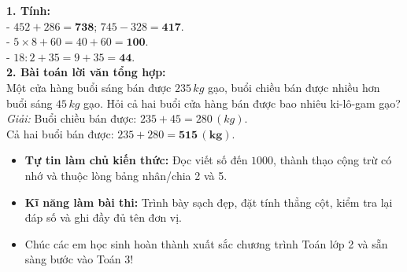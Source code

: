 \documentclass[10pt,a4paper]{article}
\begin{document}
\vspace{-1.5mm}
\noindent
\begin{minipage}[t]{0.49\textwidth}\vspace{0pt}
\begin{tcolorbox}[
  enhanced,
  colback=green!4!white,
  colframe=green!60!black,
  arc=2mm, boxrule=0.8pt,
  left=2mm, right=2mm, top=1.8mm, bottom=1.8mm,
  title={\footnotesize\bfseries\color{white}\faCheckCircle\ 4. Bài tập tổng hợp cuối năm mẫu}
]
{\footnotesize
\textbf{1. Tính:}\\
- $452 + 286 = \mathbf{738}$; \quad $745 - 328 = \mathbf{417}$.\\
- $5 \times 8 + 60 = 40 + 60 = \mathbf{100}$.\\
- $18 : 2 + 35 = 9 + 35 = \mathbf{44}$.\\
\textbf{2. Bài toán lời văn tổng hợp:}\\
Một cửa hàng buổi sáng bán được $235\,kg$ gạo, buổi chiều bán được nhiều hơn buổi sáng $45\,kg$ gạo. Hỏi cả hai buổi cửa hàng bán được bao nhiêu ki-lô-gam gạo?\\
\textit{Giải:} Buổi chiều bán được: $235 + 45 = 280\,(kg)$.\\
Cả hai buổi bán được: $235 + 280 = \mathbf{515\,(kg)}$.
}
\end{tcolorbox}
\end{minipage}
\hfill
\begin{minipage}[t]{0.49\textwidth}\vspace{0pt}
\begin{tcolorbox}[
  enhanced,
  colback=rose!4!white,
  colframe=rose!70!black,
  arc=2mm, boxrule=0.8pt,
  left=2mm, right=2mm, top=1.8mm, bottom=1.8mm,
  title={\footnotesize\bfseries\color{white}\faGraduationCap\ 5. Hành trang vững bước vào Lớp 3}
]
{\footnotesize
\begin{itemize}\setlength{\itemsep}{1.5pt}\setlength{\leftskip}{-2.5mm}
  \item \textbf{Tự tin làm chủ kiến thức:} Đọc viết số đến $1000$, thành thạo cộng trừ có nhớ và thuộc lòng bảng nhân/chia 2 và 5.
  \item \textbf{Kĩ năng làm bài thi:} Trình bày sạch đẹp, đặt tính thẳng cột, kiểm tra lại đáp số và ghi đầy đủ tên đơn vị.
  \item Chúc các em học sinh hoàn thành xuất sắc chương trình Toán lớp 2 và sẵn sàng bước vào Toán 3!
\end{itemize}
}
\end{tcolorbox}
\end{minipage}
\end{document}
